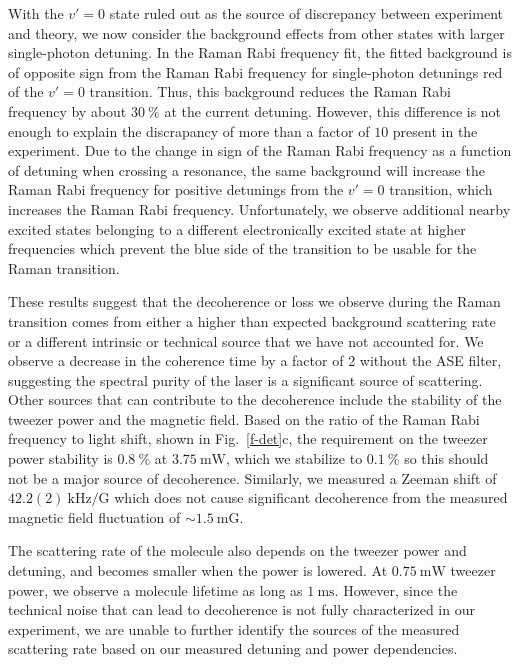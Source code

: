 \documentclass[aps,prl,twocolumn,10pt,superscriptaddress]{revtex4-1}
\newcommand{\todo}[1]{}
\begin{document}
With the $ v' = 0 $ state ruled out as the source of discrepancy between experiment and theory,
we now consider the background effects from other states with larger single-photon detuning.
In the Raman Rabi frequency fit,
the fitted background is of opposite sign from the Raman Rabi frequency
for single-photon detunings red of the $v' = 0 $ transition.
Thus, this background reduces the Raman Rabi frequency by about $30~\mathrm{\%}$
at the current detuning.
However, this difference is not enough to explain the discrapancy of more than a factor of $10$
present in the experiment.
Due to the change in sign of the Raman Rabi frequency as a function of detuning
when crossing a resonance, the same background will increase the Raman Rabi frequency
for positive detunings from the $v' = 0$ transition,
which increases the Raman Rabi frequency.
Unfortunately, we observe additional nearby excited states
belonging to a different electronically excited state at higher frequencies
which prevent the blue side of the transition to be usable for the Raman transition.

\todo{change scattering to decoherence? since the fluctuation of light shift
  does not lead to scattering but only decherence.}
These results suggest that the decoherence or loss we observe during the Raman transition
comes from either a higher than expected background scattering rate
or a different intrinsic or technical source that we have not accounted for.
We observe a decrease in the coherence time by a factor of 2 without the ASE filter,
suggesting the spectral purity of the laser is a significant source of scattering.
Other sources that can contribute to the decoherence include
the stability of the tweezer power and the magnetic field.
Based on the ratio of the Raman Rabi frequency to light shift, shown in Fig.~\ref{f-det}c,
the requirement on the tweezer power stability is $0.8~\mathrm{\%}$ at $3.75~\mathrm{mW}$,
which we stabilize to $0.1~\mathrm{\%}$ so this should not be a major source of decoherence.
Similarly, we measured a Zeeman shift of $42.2(2)~\mathrm{kHz/G}$
which does not cause significant decoherence from the measured magnetic field
fluctuation of $\sim1.5~\mathrm{mG}$.

The scattering rate of the molecule also depends on the tweezer power and detuning, and becomes smaller when the power is lowered.
At $0.75~\mathrm{mW}$ tweezer power, we observe a molecule lifetime as long as $1~\mathrm{ms}$.
However, since the technical noise that can lead to decoherence
is not fully characterized in our experiment,
we are unable to further identify the sources of the measured scattering rate
based on our measured detuning and power dependencies.
\end{document}
